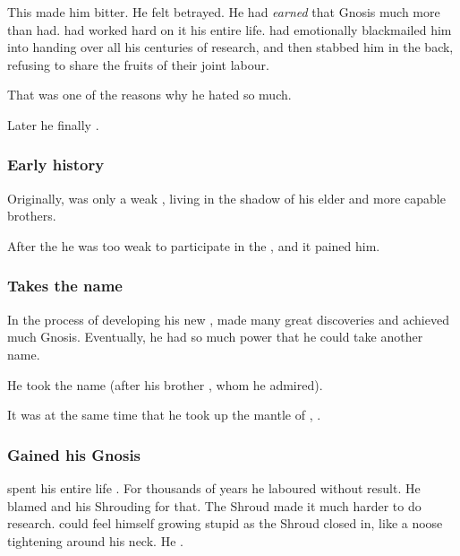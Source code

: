 This made him bitter. 
He felt betrayed. 
He had \emph{earned} that Gnosis much more than \Ishnaruchaefir{} had.
\Secherdamon{} had worked hard on it his entire life. 
\Ishnaruchaefir{} had emotionally blackmailed him into handing over all his centuries of research, and then stabbed him in the back, refusing to share the fruits of their joint labour. 

That was one of the reasons why he hated \Ishnaruchaefir{} so much. 

Later he finally . 





\subsubsection{Early history}
Originally, \HriistD{} was only a weak \vertex, living in the shadow of his elder and more capable brothers. 

After the  he was too weak to participate in the , and it pained him. 





\subsubsection{Takes the name \Nexagglachel}
In the process of developing his new , \Secherdamon made many great discoveries and achieved much Gnosis.
Eventually, he had so much power that he could take another name. 

He took the name {\quo{\Nexagglachel}} (after his brother , whom he admired). 

It was at the same time that he took up the mantle of \quo{\RissitNechsain}, . 





\subsubsection{Gained his Gnosis}
\Secherdamon{} spent his entire life . 
For thousands of years he laboured without result. 
He blamed \Ishnaruchaefir{} and his Shrouding for that. 
The Shroud made it much harder to do research. 
\Secherdamon{} could feel himself growing stupid as the Shroud closed in, like a noose tightening around his neck. 
He . 

